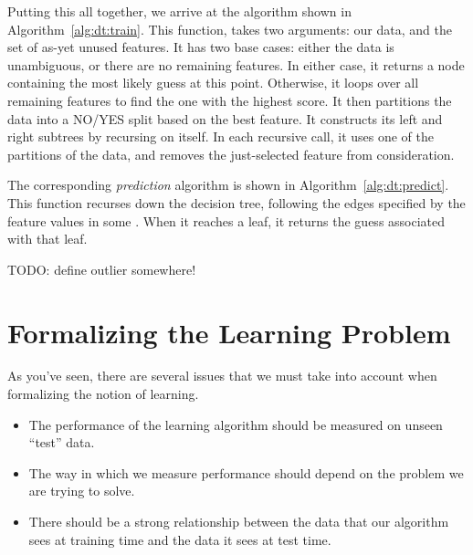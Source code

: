 Putting this all together, we arrive at the algorithm shown in
Algorithm~\ref{alg:dt:train}.  This function,
 takes two arguments: our data, and the set of
as-yet unused features.  It has two base cases: either the data is
unambiguous, or there are no remaining features.  In either case, it
returns a  node containing the most likely guess at this
point.  Otherwise, it loops over all remaining features to find the
one with the highest score.  It then partitions the data into a NO/YES
split based on the best feature.  It constructs its left and right
subtrees by recursing on itself.  In each recursive call, it uses one
of the partitions of the data, and removes the just-selected feature
from consideration.


The corresponding \emph{prediction} algorithm is shown in
Algorithm~\ref{alg:dt:predict}.  This function recurses down the decision
tree, following the edges specified by the feature values in some
.  When it reaches a leaf, it returns the guess
associated with that leaf.

TODO: define outlier somewhere!

\section{Formalizing the Learning Problem}

As you've seen, there are several issues that we must take into
account when formalizing the notion of learning.

\begin{itemize}
\item The performance of the learning algorithm should be measured on
  unseen ``test'' data.

\item The way in which we measure performance should depend on the
  problem we are trying to solve.

\item There should be a strong relationship between the data that our
  algorithm sees at training time and the data it sees at test time.
\end{itemize}

